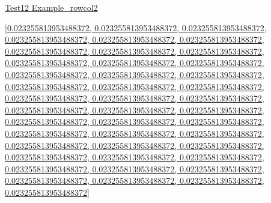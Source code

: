\documentclass[12pt]{article}
\begin{document}
\noindent \url{Test12 Example_rowcol2}

\noindent \url{[0.023255813953488372, 0.023255813953488372, 0.023255813953488372, 0.023255813953488372, 0.023255813953488372, 0.023255813953488372, 0.023255813953488372, 0.023255813953488372, 0.023255813953488372, 0.023255813953488372, 0.023255813953488372, 0.023255813953488372, 0.023255813953488372, 0.023255813953488372, 0.023255813953488372, 0.023255813953488372, 0.023255813953488372, 0.023255813953488372, 0.023255813953488372, 0.023255813953488372, 0.023255813953488372, 0.023255813953488372, 0.023255813953488372, 0.023255813953488372, 0.023255813953488372, 0.023255813953488372, 0.023255813953488372, 0.023255813953488372, 0.023255813953488372, 0.023255813953488372, 0.023255813953488372, 0.023255813953488372, 0.023255813953488372, 0.023255813953488372, 0.023255813953488372, 0.023255813953488372, 0.023255813953488372, 0.023255813953488372, 0.023255813953488372, 0.023255813953488372, 0.023255813953488372, 0.023255813953488372, 0.023255813953488372]}
\end{document}
